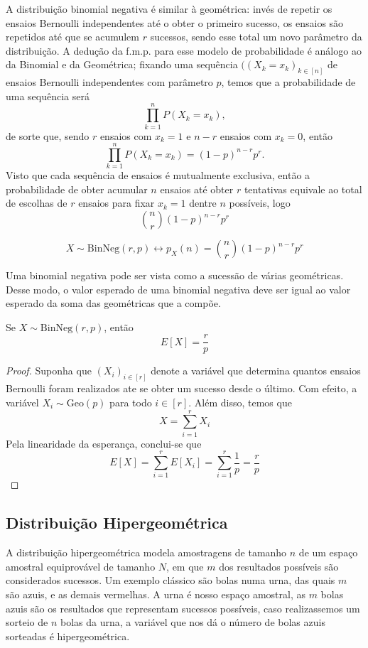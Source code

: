 A distribuição binomial negativa é similar à geométrica: invés de repetir os ensaios
Bernoulli independentes até o obter o primeiro sucesso, os ensaios são repetidos até
que se acumulem $r$ sucessos, sendo esse total um novo parâmetro da distribuição.
A dedução da f.m.p. para esse modelo de probabilidade é análogo ao da Binomial e da
Geométrica; fixando uma sequência $((X_k = x_k)_{k \in [n]}$ de ensaios Bernoulli
independentes com parâmetro $p$, temos que a probabilidade de uma sequência será
\[
	\prod_{k=1}^n P(X_k = x_k),
\]
de sorte que, sendo $r$ ensaios com $x_k = 1$ e $n-r$ ensaios com $x_k = 0$, então
\[
	\prod_{k=1}^n P(X_k = x_k) = (1-p)^{n-r} p^r.
\]
Visto que cada sequência de ensaios é mutualmente exclusiva, então a probabilidade
de obter acumular $n$ ensaios até obter $r$ tentativas equivale ao total de escolhas
de $r$ ensaios para fixar $x_k = 1$ dentre $n$ possíveis, logo
\[
	\binom{n}{r} (1-p)^{n-r} p^r
\]

\begin{def:binomial negativa}
\[
	X \sim \mathrm{BinNeg}(r, p) \longleftrightarrow p_X(n) = \binom{n}{r} (1-p)^{n-r} p^r
\]
\end{def:binomial negativa}

Uma binomial negativa pode ser vista como a sucessão de várias geométricas. Desse modo,
o valor esperado de uma binomial negativa deve ser igual ao valor esperado da soma das
geométricas que a compõe.

\begin{prop:esperanca binomial negativa}
Se $X \sim \mathrm{BinNeg}(r, p)$, então
\[
	E[X] = \frac{r}{p}
\]
\begin{proof}
	Suponha que $(X_i)_{i \in [r]}$ denote a variável que determina quantos
	ensaios Bernoulli foram realizados ate se obter um sucesso desde o último. Com efeito,
	a variável $X_i \sim \mathrm{Geo}(p)$ para todo $i \in [r]$. Além disso, temos que
	\[
		X = \sum_{i = 1}^r X_i
	\]
	Pela linearidade da esperança, conclui-se que
	\[
		E[X] = \sum_{i = 1}^r E[X_i] = \sum_{i=1}^r \frac{1}{p} = \frac{r}{p}
	\]
\end{proof}
\end{prop:esperanca binomial negativa}

\subsection{Distribuição Hipergeométrica}

A distribuição hipergeométrica modela amostragens de tamanho $n$ de um espaço amostral
equiprovável de tamanho $N$, em que $m$ dos resultados possíveis são considerados
sucessos. Um exemplo clássico são bolas numa urna, das quais $m$ são azuis, e as demais
vermelhas. A urna é nosso espaço amostral, as $m$ bolas azuis são os resultados que
representam sucessos possíveis, caso realizassemos um sorteio de $n$ bolas da urna,
a variável que nos dá o número de bolas azuis sorteadas é hipergeométrica.

